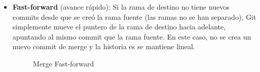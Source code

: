 \documentclass{apuntes_itsv}
\begin{document}
\begin{itemize}
  \item \textbf{Fast-forward} (avance rápido):
    Si la rama de destino no tiene nuevos commits desde que se creó la rama fuente (las
    ramas no se han separado), Git simplemente mueve el puntero de la rama de destino hacia adelante,
    apuntando al mismo commit que la rama fuente. En este caso, no se crea un nuevo
    commit de merge y la historia es se mantiene lineal.

    \begin{figure}[h]
      \begin{subfigure}[b]{\textwidth}
        \centering
      \end{subfigure}
    
      \begin{subfigure}[b]{\textwidth}
        \centering
      \end{subfigure}
      \caption{Merge Fast-forward}
      \label{fig:merge_fast_forward}
    \end{figure}


\end{itemize}
\end{document}
